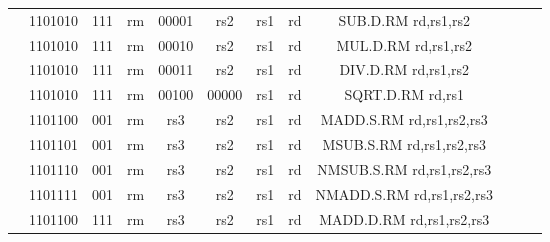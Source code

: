 \begin{table}[p]
\begin{small}
\begin{center}
\begin{tabular}{rcccccccccccl}
&
\multicolumn{1}{|c|}{1101010} &
\multicolumn{1}{c|}{111} &
\multicolumn{1}{c|}{rm} &
\multicolumn{2}{c|}{00001} &
\multicolumn{1}{c|}{rs2} &
\multicolumn{1}{c|}{rs1} &
\multicolumn{1}{c|}{rd} & SUB.D.RM rd,rs1,rs2 \\
\cline{2-9}
  

&
\multicolumn{1}{|c|}{1101010} &
\multicolumn{1}{c|}{111} &
\multicolumn{1}{c|}{rm} &
\multicolumn{2}{c|}{00010} &
\multicolumn{1}{c|}{rs2} &
\multicolumn{1}{c|}{rs1} &
\multicolumn{1}{c|}{rd} & MUL.D.RM rd,rs1,rs2 \\
\cline{2-9}
  

&
\multicolumn{1}{|c|}{1101010} &
\multicolumn{1}{c|}{111} &
\multicolumn{1}{c|}{rm} &
\multicolumn{2}{c|}{00011} &
\multicolumn{1}{c|}{rs2} &
\multicolumn{1}{c|}{rs1} &
\multicolumn{1}{c|}{rd} & DIV.D.RM rd,rs1,rs2 \\
\cline{2-9}
  

&
\multicolumn{1}{|c|}{1101010} &
\multicolumn{1}{c|}{111} &
\multicolumn{1}{c|}{rm} &
\multicolumn{2}{c|}{00100} &
\multicolumn{1}{c|}{00000} &
\multicolumn{1}{c|}{rs1} &
\multicolumn{1}{c|}{rd} & SQRT.D.RM rd,rs1 \\
\cline{2-9}
  

&
\multicolumn{1}{|c|}{1101100} &
\multicolumn{1}{c|}{001} &
\multicolumn{1}{c|}{rm} &
\multicolumn{2}{c|}{rs3} &
\multicolumn{1}{c|}{rs2} &
\multicolumn{1}{c|}{rs1} &
\multicolumn{1}{c|}{rd} & MADD.S.RM rd,rs1,rs2,rs3 \\
\cline{2-9}
  

&
\multicolumn{1}{|c|}{1101101} &
\multicolumn{1}{c|}{001} &
\multicolumn{1}{c|}{rm} &
\multicolumn{2}{c|}{rs3} &
\multicolumn{1}{c|}{rs2} &
\multicolumn{1}{c|}{rs1} &
\multicolumn{1}{c|}{rd} & MSUB.S.RM rd,rs1,rs2,rs3 \\
\cline{2-9}
  

&
\multicolumn{1}{|c|}{1101110} &
\multicolumn{1}{c|}{001} &
\multicolumn{1}{c|}{rm} &
\multicolumn{2}{c|}{rs3} &
\multicolumn{1}{c|}{rs2} &
\multicolumn{1}{c|}{rs1} &
\multicolumn{1}{c|}{rd} & NMSUB.S.RM rd,rs1,rs2,rs3 \\
\cline{2-9}
  

&
\multicolumn{1}{|c|}{1101111} &
\multicolumn{1}{c|}{001} &
\multicolumn{1}{c|}{rm} &
\multicolumn{2}{c|}{rs3} &
\multicolumn{1}{c|}{rs2} &
\multicolumn{1}{c|}{rs1} &
\multicolumn{1}{c|}{rd} & NMADD.S.RM rd,rs1,rs2,rs3 \\
\cline{2-9}
  

&
\multicolumn{1}{|c|}{1101100} &
\multicolumn{1}{c|}{111} &
\multicolumn{1}{c|}{rm} &
\multicolumn{2}{c|}{rs3} &
\multicolumn{1}{c|}{rs2} &
\multicolumn{1}{c|}{rs1} &
\multicolumn{1}{c|}{rd} & MADD.D.RM rd,rs1,rs2,rs3 \\
\cline{2-9}
  


\end{tabular}
\end{center}
\end{small}
\end{table}
